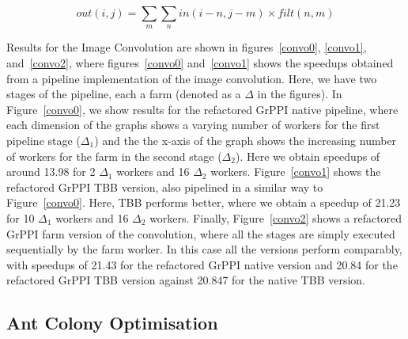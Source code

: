 \begin{equation}\label{eqn:01}
\textit{out}(i,j)=\sum_{m}\sum_{n} \textit{in}(i-n,j-m)\times \textit{filt}(n,m)
\end{equation}

Results for the Image Convolution are shown in figures~\ref{convo0}, \ref{convo1}, and~\ref{convo2}, where figures~\ref{convo0} and~\ref{convo1} shows the speedups obtained from a pipeline implementation of the image convolution. Here, we have two stages of the pipeline, each a farm (denoted as a $\Delta$ in the figures). In Figure~\ref{convo0}, we show results for the refactored GrPPI native pipeline, where each dimension of the graphs shows a varying number of workers for the first pipeline stage ($\Delta_{1}$) and the the x-axis of the graph shows the increasing number of workers for the farm in the second stage ($\Delta_{2}$). Here we obtain speedups of around 13.98 for 2 $\Delta_{1}$ workers and 16 $\Delta_{2}$ workers. Figure~\ref{convo1} shows the refactored GrPPI TBB version, also pipelined in a similar way to Figure~\ref{convo0}. Here, TBB performs better, where we obtain a speedup of 21.23 for 10 $\Delta_{1}$ workers and 16 $\Delta_{2}$ workers. Finally, Figure~\ref{convo2} shows a refactored GrPPI farm version of the convolution, where all the stages are simply executed sequentially by the farm worker. In this case all the versions perform comparably, with speedups of 21.43 for the refactored GrPPI native version and 20.84 for the refactored GrPPI TBB version against 20.847 for the native TBB version.

\subsection{Ant Colony Optimisation}

